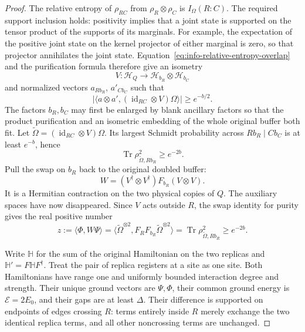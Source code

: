 \documentclass[11pt]{article}
\numberwithin{equation}{section}
\theoremstyle{definition}
\theoremstyle{remark}
\DeclareMathOperator{\Tr}{Tr}
\DeclareMathOperator{\id}{id}
\begin{document}
\begin{proof}
The relative entropy of $\rho_{RC}$ from
$\rho_R\otimes\rho_C$ is $I_\Omega(R:C)$.  The required support
inclusion holds: positivity implies that a joint state is supported
on the tensor product of the supports of its marginals.  For example,
the expectation of the positive joint state on the kernel projector
of either marginal is zero, so that projector annihilates the joint
state.  Equation~\eqref{eq:info-relative-entropy-overlap} and the
purification formula therefore give an isometry
\[
 V:\mathcal H_Q\longrightarrow\mathcal H_{b_R}\otimes\mathcal H_{b_C}
\]
and normalized vectors $a_{Rb_R}$, $a'_{Cb_C}$ such that
\begin{equation}
 \bigl|\langle a\otimes a',(\id_{RC}\otimes V)\Omega\rangle\bigr|
       \ge e^{-b/2}.
 \label{eq:info-split-overlap}
\end{equation}
The factors $b_R,b_C$ may first be enlarged by blank ancillary factors
so that the product purification and an isometric embedding of the
whole original buffer both fit.  Let
$\widetilde\Omega=(\id_{RC}\otimes V)\Omega$.
Its largest Schmidt probability across $Rb_R\mid Cb_C$ is at least
$e^{-b}$, hence
\[
 \Tr\rho_{\widetilde\Omega,Rb_R}^{2}\ge e^{-2b}.
\]
Pull the swap on $b_R$ back to the original doubled buffer:
\[
 W=(V^\dagger\otimes V^\dagger)F_{b_R}(V\otimes V).
\]
It is a Hermitian contraction on the two physical copies of $Q$.
The auxiliary spaces have now disappeared.  Since $V$ acts outside
$R$, the swap identity for purity gives the real positive number
\begin{equation}
 z:=\langle\Phi,W\Psi\rangle
   =\langle\widetilde\Omega^{\otimes2},
          F_RF_{b_R}\widetilde\Omega^{\otimes2}\rangle
   =\Tr\rho_{\widetilde\Omega,Rb_R}^{2}
   \ge e^{-2b}.
 \label{eq:info-reset-overlap}
\end{equation}

Write $\mathbb H$ for the sum of the original Hamiltonian on the two
replicas and $\mathbb H'=F\mathbb H F^\dagger$.  Treat the pair of
replica registers at a site as one site.  Both Hamiltonians have range
one and uniformly bounded interaction degree and strength.  Their
unique ground vectors are $\Psi,\Phi$, their common ground energy is
$\mathcal E=2E_0$, and their gaps are at least $\Delta$.  Their
difference is supported on endpoints of edges crossing $R$: terms
entirely inside $R$ merely exchange the two identical replica terms,
and all other noncrossing terms are unchanged.


\end{proof}
\end{document}
